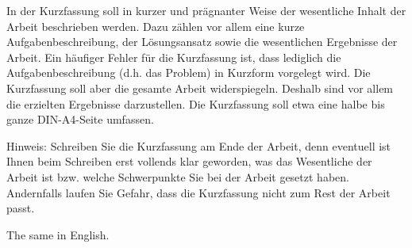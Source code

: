\kurzfassung
In der Kurzfassung soll in kurzer und prägnanter Weise der wesentliche Inhalt der Arbeit beschrieben werden. Dazu zählen vor allem eine kurze Aufgabenbeschreibung, der Lösungsansatz sowie die wesentlichen Ergebnisse der Arbeit. Ein häufiger Fehler für die Kurzfassung ist, dass lediglich die Aufgabenbeschreibung (d.h. das Problem) in Kurzform vorgelegt wird. Die Kurzfassung soll aber die gesamte Arbeit widerspiegeln. Deshalb sind vor allem die erzielten Ergebnisse darzustellen. Die Kurzfassung soll etwa eine halbe bis ganze DIN-A4-Seite umfassen.

Hinweis: Schreiben Sie die Kurzfassung am Ende der Arbeit, denn eventuell ist Ihnen beim Schreiben erst vollends klar geworden, was das Wesentliche der Arbeit ist bzw. welche Schwerpunkte Sie bei der Arbeit gesetzt haben. Andernfalls laufen Sie Gefahr, dass die Kurzfassung nicht zum Rest der Arbeit passt.

\kurzfassungEN
The same in English.
